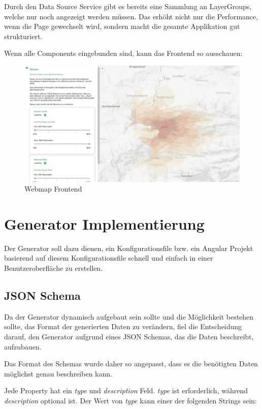 Durch den Data Source Service gibt es bereits eine Sammlung an LayerGroups, welche nur noch angezeigt werden müssen.
Das erhöht nicht nur die Performance, wenn die Page gewechselt wird, sondern macht die gesamte Applikation gut strukturiert.

Wenn alle Components eingebunden sind, kann das Frontend so ausschauen:
\begin{figure}[hbt!]
    \centering
    \includegraphics[scale=.3]{pics/webmap-frontend}
    \caption{Webmap Frontend}
    \label{fig:webmap-frontend}
\end{figure}


\section{Generator Implementierung}
Der Generator soll dazu dienen, ein Konfigurationsfile bzw. ein Angular Projekt basierend auf diesem Konfigurationsfile
schnell und einfach in einer Benutzeroberfläche zu erstellen.

\subsection{JSON Schema}
Da der Generator dynamisch aufgebaut sein sollte und die Möglichkeit bestehen sollte, das Format der generierten
Daten zu verändern, fiel die Entscheidung darauf, den Generator aufgrund eines JSON Schemas, das die Daten beschreibt,
aufzubauen.

Das Format des Schemas wurde daher so angepasst, dass es die benötigten Daten möglichst genau beschreiben kann.

Jede Property hat ein \textit{type} und \textit{description} Feld.
\textit{type} ist erforderlich, während \textit{description} optional ist.
Der Wert von \textit{type} kann einer der folgenden Strings sein:

